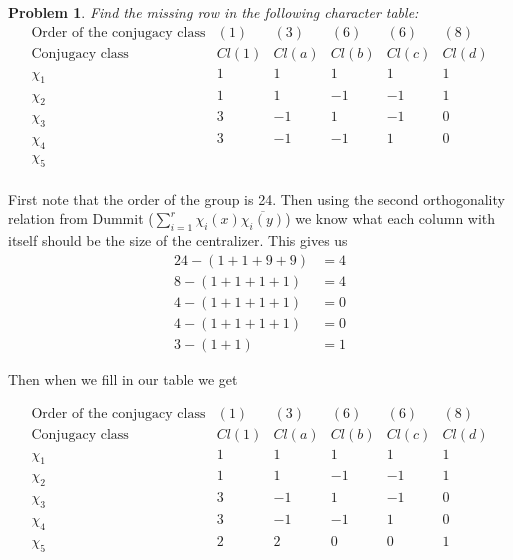 \documentclass[10pt]{article}
\newcommand{\sk}{\vskip 10mm}
\theoremstyle{plain}
\newtheorem{problem}{Problem}
\theoremstyle{remark}
\begin{document}
\begin{problem}
  Find the missing row in the following character table:
  \[
    \begin{array}{c|ccccc}
      \text{Order of the conjugacy class} & (1) & (3) & (6) & (6) & (8)\\
      \text{Conjugacy class} & Cl(1) & Cl(a) & Cl(b) & Cl(c) & Cl(d)\\
      \hline
      \chi_1 & 1 & 1 & 1 & 1 & 1\\
      \chi_2 & 1 & 1 & -1 & -1 & 1\\
      \chi_3 & 3 & -1 & 1 & -1 & 0\\
      \chi_4 & 3 & -1 & -1 & 1 & 0\\
      \chi_5 &&&&&\\
    \end{array}
  \]
\end{problem}

First note that the order of the group is 24. Then using the second
orthogonality relation from Dummit ($\sum_{i=1}^r\chi_i(x)\overline{\chi_i(y)}$) we
know what each column with itself should be the size of the centralizer.
This gives us
\begin{align*}
  24 - (1+1+9+9) &= 4\\
  8 - (1+1+1+1) &= 4\\
  4 - (1+1+1+1) &= 0\\
  4 - (1+1+1+1) &= 0\\
  3 - (1+1) &= 1
\end{align*}

Then when we fill in our table we get

\[
  \begin{array}{c|ccccc}
    \text{Order of the conjugacy class} & (1) & (3) & (6) & (6) & (8)\\
    \text{Conjugacy class} & Cl(1) & Cl(a) & Cl(b) & Cl(c) & Cl(d)\\
    \hline
    \chi_1 & 1 & 1 & 1 & 1 & 1\\
    \chi_2 & 1 & 1 & -1 & -1 & 1\\
    \chi_3 & 3 & -1 & 1 & -1 & 0\\
    \chi_4 & 3 & -1 & -1 & 1 & 0\\
    \chi_5 & 2 & 2 & 0 & 0 & 1\\
  \end{array}
\]

\sk
\end{document}
